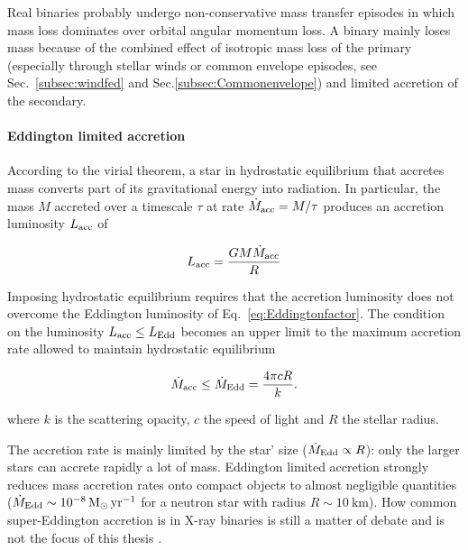 \documentclass[a4paper,titlepage]{book}     	%
\newcommand{\sun}{\ensuremath{_\odot}}
\newcommand{\mdot}{\ensuremath{\dot{M}}}
\newcommand{\yr}{\text{yr}}
\begin{document}
Real binaries probably undergo non-conservative mass transfer episodes in which mass loss dominates over orbital angular momentum loss. A binary mainly loses mass because of the combined effect of isotropic mass loss of the primary (especially through stellar winds or common envelope episodes, see Sec.\ \ref{subsec:windfed} and Sec.\ref{subsec:Commonenvelope}) and limited accretion of the secondary. 

\paragraph{Eddington limited accretion}
According to the virial theorem, a star in hydrostatic equilibrium that accretes mass converts part of its gravitational energy into radiation. In particular, the mass $M$ accreted over a timescale $\tau$ at rate $\mdot_{\rm acc} = M/\tau$ produces an accretion luminosity $L_{\rm acc}$ of

\begin{equation}
L_\textup{acc} = \frac{G M \mdot_{\rm acc}}{R}
\end{equation}

Imposing hydrostatic equilibrium requires that the accretion luminosity does not overcome the Eddington luminosity of Eq.\ \ref{eq:Eddingtonfactor}. The condition on the luminosity $L_{\rm acc} \leq L_{\rm Edd}$ becomes an upper limit to the maximum accretion rate allowed to maintain hydrostatic equilibrium

\begin{equation}\label{eq:Eddingtonaccretion}
\mdot_{\rm acc} \leq \dot{M}_\textup{Edd} = \frac{4 \pi c R}{k}.
\end{equation}

where $k$ is the scattering opacity, $c$ the speed of light and $R$ the stellar radius.

The accretion rate is mainly limited by the star' size ($\dot{M}_\textup{Edd} \propto R$): only the larger stars can accrete rapidly a lot of mass. Eddington limited accretion strongly reduces mass accretion rates onto compact objects to almost negligible quantities ($\dot{M}_\textup{Edd} \sim\SI{e-8}{M\sun~\yr^{-1}}$ for a neutron star with radius $R\sim\SI{10}{\kilo\metre}$). How common super-Eddington accretion is in X-ray binaries is still a matter of debate and is not the focus of this thesis \cite{binaries}.
\end{document}
